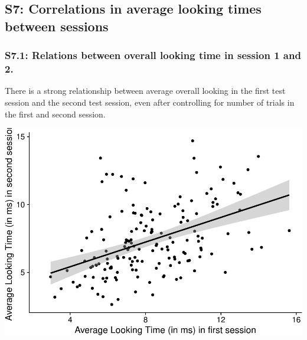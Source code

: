 \documentclass[
  man, donotrepeattitle,floatsintext]{apa6}
\begin{document}
\hypertarget{s7-correlations-in-average-looking-times-between-sessions}{%
\subsection{S7: Correlations in average looking times between sessions}\label{s7-correlations-in-average-looking-times-between-sessions}}

\hypertarget{s7.1-relations-between-overall-looking-time-in-session-1-and-2.}{%
\subsubsection{S7.1: Relations between overall looking time in session 1 and 2.}\label{s7.1-relations-between-overall-looking-time-in-session-1-and-2.}}

There is a strong relationship between average overall looking in the first test session and the second test session, even after controlling for number of trials in the first and second session.

\includegraphics{MB1T_supplement_files/figure-latex/unnamed-chunk-9-1.pdf}
\end{document}
